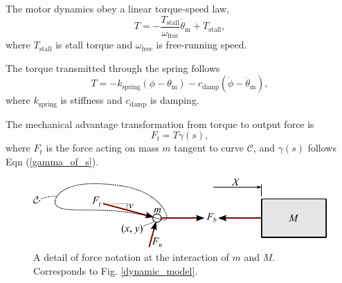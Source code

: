 \documentclass[journal]{IEEEtran}
\begin{document}
The motor dynamics obey a linear torque-speed law,
\begin{equation}
T = -\frac{T_\text{stall}}{\omega_\text{free}} \dot{\theta}_\text{m} + T_\text{stall},
\label{torque-speed}
\end{equation}
where $T_\text{stall}$ is stall torque and $\omega_\text{free}$ is free-running speed.

The torque transmitted through the spring follows
\begin{equation}
T = -k_\text{spring}(\phi - \theta_\text{m}) - c_\text{damp}(\dot{\phi} - \dot{\theta}_\text{m}),
\end{equation}
where $k_\text{spring}$ is stiffness and $c_\text{damp}$ is damping.

The mechanical advantage transformation from torque to output force is
\begin{equation}
F_t = T \gamma(s),
\end{equation}
where $F_t$ is the force acting on mass $m$ tangent to curve $\mathcal{C}$, and $\gamma(s)$ follows Eqn (\ref{gamma_of_s}).

\begin{figure}[!t]
\centering
\includegraphics[scale=0.65]{dynamic_model_detail}
\caption{A detail of force notation at the interaction of $m$ and $M$.  Corresponds to Fig. \ref{dynamic_model}.}
\label{dynamic_model_detail}
\end{figure}
\end{document}
